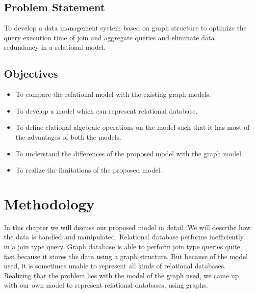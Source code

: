\documentclass[12pt, oneside]{book}
\begin{document}
\section{Problem Statement}
To develop a data management system based on graph structure to optimize the query execution time of join and aggregate queries and eliminate data redundancy in a relational model.  

\section{Objectives}
\begin{itemize}
 \item To compare the relational model with the existing graph models.
 \item To develop a model which can represent relational database.
 \item To define elational algebraic operations on the model such that it has most of the advantages of both the models.
 \item To understand the differences of the proposed model with the graph model.
 \item To realize the limitations of the proposed model.
\end{itemize}

\chapter{Methodology}
In this chapter we will discuss our proposed model in detail. We will describe how the data is handled and manipulated.
Relational database performs inefficiently in a join type query. Graph database is able to perform join type queries quite fast because it stores the data using a graph structure. But because of the model used, it is sometimes unable to represent all kinds of relational databases. Realizing that the problem lies with the model of the graph used, we came up with our own model to represent relational databases, using graphs.\\ \par
\end{document}
